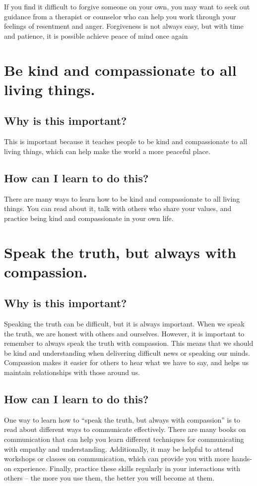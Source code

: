 \documentclass[11pt]{article}
\begin{document}
If you find it difficult to forgive someone on your own, you may want to seek out guidance from a therapist or counselor who can help you work through your feelings of resentment and anger. Forgiveness is not always easy, but with time and patience, it is possible achieve peace of mind once again

\section{Be kind and compassionate to all living things.}
\label{sec:org4bfda22}
\subsection{Why is this important?}
\label{sec:orgc576b09}
This is important because it teaches people to be kind and compassionate to all living things, which can help make the world a more peaceful place.

\subsection{How can I learn to do this?}
\label{sec:org3069557}
There are many ways to learn how to be kind and compassionate to all living things. You can read about it, talk with others who share your values, and practice being kind and compassionate in your own life.

\section{Speak the truth, but always with compassion.}
\label{sec:org126df13}
\subsection{Why is this important?}
\label{sec:orgb8d0c22}
Speaking the truth can be difficult, but it is always important. When we speak the truth, we are honest with others and ourselves. However, it is important to remember to always speak the truth with compassion. This means that we should be kind and understanding when delivering difficult news or speaking our minds. Compassion makes it easier for others to hear what we have to say, and helps us maintain relationships with those around us.

\subsection{How can I learn to do this?}
\label{sec:org6a9b567}
One way to learn how to ``speak the truth, but always with compassion'' is to read about different ways to communicate effectively. There are many books on communication that can help you learn different techniques for communicating with empathy and understanding. Additionally, it may be helpful to attend workshops or classes on communication, which can provide you with more hands-on experience. Finally, practice these skills regularly in your interactions with others – the more you use them, the better you will become at them.
\end{document}
